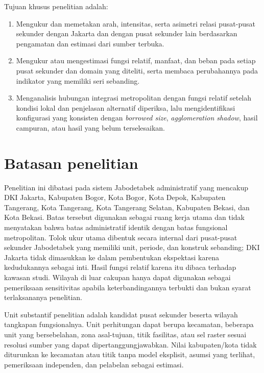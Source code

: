 \documentclass[11pt,a4paper,oneside,openany,indonesian]{report}
\begin{document}
Tujuan khusus penelitian adalah:

\begin{enumerate}
  \item Mengukur dan memetakan arah, intensitas, serta asimetri relasi pusat-pusat sekunder dengan Jakarta dan dengan pusat sekunder lain berdasarkan pengamatan dan estimasi dari sumber terbuka.
  \item Mengukur atau mengestimasi fungsi relatif, manfaat, dan beban pada setiap pusat sekunder dan domain yang diteliti, serta membaca perubahannya pada indikator yang memiliki seri sebanding.
  \item Menganalisis hubungan integrasi metropolitan dengan fungsi relatif setelah kondisi lokal dan penjelasan alternatif diperiksa, lalu mengidentifikasi konfigurasi yang konsisten dengan \textit{borrowed size}, \textit{agglomeration shadow}, hasil campuran, atau hasil yang belum terselesaikan.
\end{enumerate}

\section{Batasan penelitian}

Penelitian ini dibatasi pada sistem Jabodetabek administratif yang mencakup DKI Jakarta, Kabupaten Bogor, Kota Bogor, Kota Depok, Kabupaten Tangerang, Kota Tangerang, Kota Tangerang Selatan, Kabupaten Bekasi, dan Kota Bekasi. Batas tersebut digunakan sebagai ruang kerja utama dan tidak menyatakan bahwa batas administratif identik dengan batas fungsional metropolitan. Tolok ukur utama dibentuk secara internal dari pusat-pusat sekunder Jabodetabek yang memiliki unit, periode, dan konstruk sebanding; DKI Jakarta tidak dimasukkan ke dalam pembentukan ekspektasi karena kedudukannya sebagai inti. Hasil fungsi relatif karena itu dibaca terhadap kawasan studi. Wilayah di luar cakupan hanya dapat digunakan sebagai pemeriksaan sensitivitas apabila keterbandingannya terbukti dan bukan syarat terlaksananya penelitian.

Unit substantif penelitian adalah kandidat pusat sekunder beserta wilayah tangkapan fungsionalnya. Unit perhitungan dapat berupa kecamatan, beberapa unit yang bersebelahan, zona asal-tujuan, titik fasilitas, atau sel raster sesuai resolusi sumber yang dapat dipertanggungjawabkan. Nilai kabupaten/kota tidak diturunkan ke kecamatan atau titik tanpa model eksplisit, asumsi yang terlihat, pemeriksaan independen, dan pelabelan sebagai estimasi.
\end{document}
